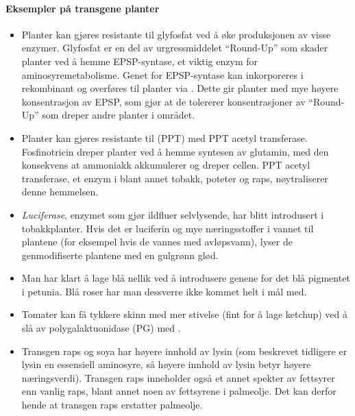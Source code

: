 \paragraph{Eksempler på transgene planter}
\begin{itemize}[nolistsep,noitemsep]
	\item {}Planter kan gjøres resistante til glyfosfat ved å øke produksjonen av visse enzymer. Glyfosfat er en del av urgressmiddelet ``Round-Up'' som skader planter ved å hemme EPSP-syntase, et viktig enzym for aminosyremetabolisme. Genet for EPSP-syntase kan inkorporeres i rekombinant  og overføres til planter via . Dette gir planter med mye høyere konsentrasjon av EPSP, som gjør at de tolererer konsentrasjoner av ``Round-Up'' som dreper andre planter i området.
	\item Planter kan gjøres resistante til  (PPT) med PPT acetyl transferase. Fosfinotricin dreper planter ved å hemme syntesen av glutamin, med den konsekvens at ammoniakk akkumulerer og dreper cellen. PPT acetyl transferase, et enzym i blant annet tobakk, poteter og raps, nøytraliserer denne hemmelsen.
	\item \emph{Luciferase}, enzymet som gjør ildfluer selvlysende, har blitt introdusert i tobakkplanter. Hvis det er luciferin og mye næringsstoffer i vannet til plantene (for eksempel hvis de vannes med avløpsvann), lyser de genmodifiserte plantene med en gulgrønn glød.
	\item {}Man har klart å lage blå nellik ved å introdusere genene for det blå pigmentet i petunia. Blå roser har man dessverre ikke kommet helt i mål med.
	\item Tomater kan få tykkere skinn med mer stivelse (fint for å lage ketchup) ved å slå av polygalaktuonidase (PG) med .
	\item {}Transgen raps og soya har høyere innhold av lysin (som beskrevet tidligere er lysin en essensiell aminosyre, så høyere innhold av lysin betyr høyere næringsverdi). Transgen raps inneholder også et annet spekter av fettsyrer enn vanlig raps, blant annet noen av fettsyrene i palmeolje. Det kan derfor hende at transgen raps erstatter palmeolje.

\end{itemize}
